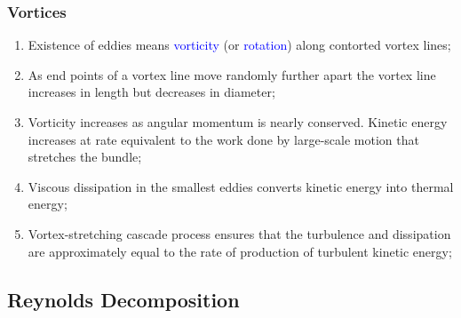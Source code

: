 \documentclass[10pt,compress]{beamer}
\newcommand{\blue}{\textcolor{blue}}
\begin{document}
\begin{frame}
 \frametitle{Vortices}
    \begin{enumerate}%
       \item<1-> Existence of eddies means  \blue{vorticity} (or \blue{rotation}) along contorted vortex lines;
       \item<1-> As end points of a vortex line move randomly further apart the vortex line increases in length but decreases in diameter;
       \item<1-> Vorticity increases as angular momentum is nearly conserved. Kinetic energy increases at rate equivalent to the work done by large-scale motion that stretches the bundle;
       \item<2-> Viscous dissipation in the smallest eddies converts kinetic energy into thermal energy;
       \item<2-> Vortex-stretching cascade process ensures that the turbulence and dissipation are approximately equal to the rate of production of turbulent kinetic energy;
       \end{enumerate} 
\end{frame}

\subsection{Reynolds Decomposition}
\end{document}
